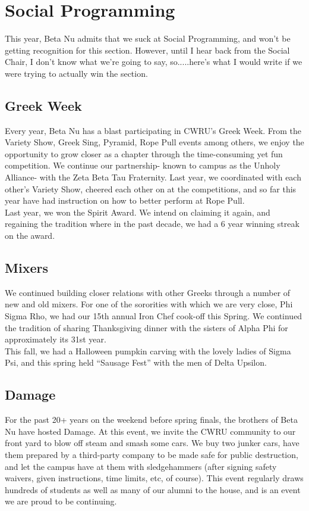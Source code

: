 \chapter{Social Programming}

  This year, Beta Nu admits that we suck at Social Programming, and won't be getting recognition for this section. However, until I hear back from the Social Chair, I don't know what we're going to say, so.....here's what I would write if we were trying to actually win the section.
  
  \section*{Greek Week}
    Every year, Beta Nu has a blast participating in CWRU's Greek Week. From the Variety Show, Greek Sing, Pyramid, Rope Pull events among others, we enjoy the opportunity to grow closer as a chapter through the time-consuming yet fun competition. We continue our partnership- known to campus as the Unholy Alliance- with the Zeta Beta Tau Fraternity. Last year, we coordinated with each other's Variety Show, cheered each other on at the competitions, and so far this year have had instruction on how to better perform at Rope Pull. \\
    
    Last year, we won the Spirit Award. We intend on claiming it again, and regaining the tradition where in the past decade, we had a 6 year winning streak on the award.
    
  \section*{Mixers}
    
    We continued building closer relations with other Greeks through a number of new and old mixers. For one of the sororities with which we are very close, Phi Sigma Rho, we had our 15th annual Iron Chef cook-off this Spring. We continued the tradition of sharing Thanksgiving dinner with the sisters of Alpha Phi for approximately its 31st year. \\
    
    This fall, we had a Halloween pumpkin carving with the lovely ladies of Sigma Psi, and this spring held ``Sausage Fest'' with the men of Delta Upsilon.
    
  \section*{Damage}
    For the past 20+ years on the weekend before spring finals, the brothers of Beta Nu have hosted Damage. At this event, we invite the CWRU community to our front yard to blow off steam and smash some cars. We buy two junker cars, have them prepared by a third-party company to be made safe for public destruction, and let the campus have at them with sledgehammers (after signing safety waivers, given instructions, time limits, etc, of course). This event regularly draws hundreds of students as well as many of our alumni to the house, and is an event we are proud to be continuing.
  
